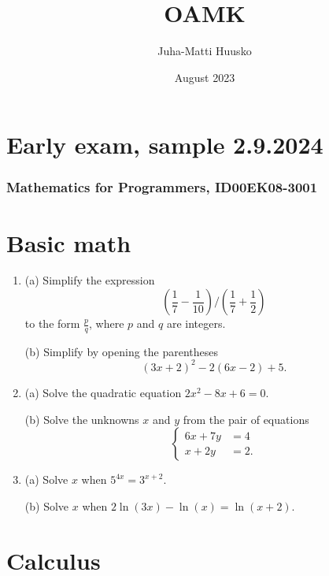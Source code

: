 \documentclass[12pt]{article}
\title{OAMK}
\author{Juha-Matti Huusko}
\date{August 2023}
\renewcommand{\ratkaisu}[1]{{\color{blue}\quad\textrm{Ratkaisu: } #1}}
\renewcommand{\ratkaisu}[1]{}
\begin{document}
\thispagestyle{empty}

\section*{Early exam, sample 2.9.2024}
\subsubsection*{Mathematics for Programmers, ID00EK08-3001}

\section*{Basic math}

\begin{enumerate}
\item 
(a) Simplify the expression
$$
\left(\frac{1}{7}-\frac{1}{10}\right)\bigg/\left(\frac{1}{7}+\frac{1}{2}\right)\ratkaisu{1/25}
$$
to the form $\frac{p}{q}$, where $p$ and $q$ are integers.

(b) Simplify by opening the parentheses
$$
(3x+2)^2-2(6x-2)+5.\ratkaisu{9x^2+13}
$$

\item (a) Solve the quadratic equation
$2x^2-8x+6=0$.%

(b) Solve the unknowns $x$ and $y$ from the pair of equations
$$
\begin{cases}
6x+7y&=4\\
x+2y&=2.
\end{cases}\ratkaisu{y=8/5, x=-6/5}
$$


\item (a) Solve $x$ when $5^{4x}=3^{x+2}$.

(b) Solve $x$ when $2\ln(3x)-\ln(x)=\ln(x+2)$.
\end{enumerate}

\newpage
\section*{Calculus}
\end{document}
